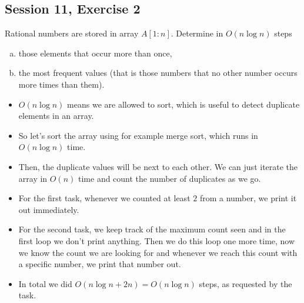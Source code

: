 \subsection {Session 11, Exercise 2}


Rational numbers are stored in array $A[1:n]$. Determine in $O(n\log{}n)$ steps

\begin{enumerate}[a)]
    \item those elements that occur more than once,
    \item the most frequent values (that is those numbers that no other number occurs more times than them).
\end{enumerate}


\begin{itemize}
    \item $O(n\log{}n)$ means we are allowed to sort, which is useful to detect duplicate elements in an array.
    \item So let's sort the array using for example merge sort, which runs in $O(n\log{}n)$ time.
    \item Then, the duplicate values will be next to each other. We can just iterate the array in $O(n)$ time and count the number of duplicates as we go.
    \item For the first task, whenever we counted at least $2$ from a number, we print it out immediately.
    \item For the second task, we keep track of the maximum count seen and in the first loop we don't print anything. Then we do this loop one more time, now we know the count we are looking for and whenever we reach this count with a specific number, we print that number out.
    \item In total we did $O(n\log{}n + 2n) = O(n\log{}n)$ steps, as requested by the task.
\end{itemize}
